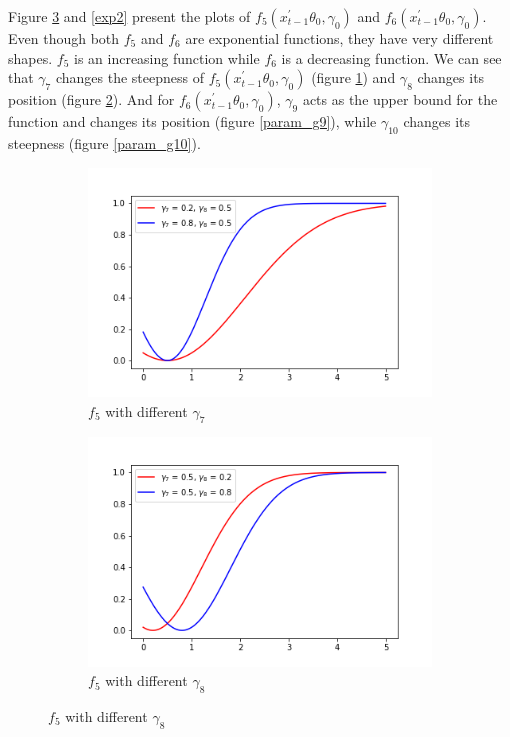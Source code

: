 \documentclass[a4paper,12pt,times,numbered,print,index]{report}
\numberwithin{equation}{section}
\begin{document}
Figure \ref{exp1} and \ref{exp2} present the plots of $f_{5}\left(x_{t-1}^{\prime }\theta _{0},\gamma_{0}\right)$ and $f_{6}\left(x_{t-1}^{\prime }\theta _{0},\gamma_{0}\right)$. Even though both $f_5$ and $f_6$ are exponential functions, they have very different shapes. $f_5$ is an increasing function while $f_6$ is a decreasing function. We can see that $\gamma_{7}$ changes the steepness of $f_{5}\left(x_{t-1}^{\prime }\theta _{0},\gamma_{0}\right)$ (figure \ref{param_g7}) and $\gamma_{8}$ changes its position (figure \ref{param_g8}). And for $f_{6}\left(x_{t-1}^{\prime }\theta _{0},\gamma_{0}\right)$, $\gamma_{9}$ acts as the upper bound for the function and changes its position (figure \ref{param_g9}), while $\gamma_{10}$ changes its steepness (figure \ref{param_g10}).

\begin{figure}[!htbp]
	\centering
	\caption{$f_{5}\left(x_{t-1}^{\prime }\theta _{0},\gamma_{0}\right)$ with different $\gamma$}
	\begin{subfigure}[b]{0.44\linewidth}
		\includegraphics[width=\linewidth]{plots/scale_expshift_g7.png}
		\caption{$f_{5}$ with different $\gamma_{7}$}
		\label{param_g7}
	\end{subfigure}
	\begin{subfigure}[b]{0.44\linewidth}
		\includegraphics[width=\linewidth]{plots/scale_expshift_g8.png}
		\caption{$f_{5}$ with different $\gamma_{8}$}
		\label{param_g8}
	\end{subfigure}
	\label{exp1}
\end{figure}
\end{document}
